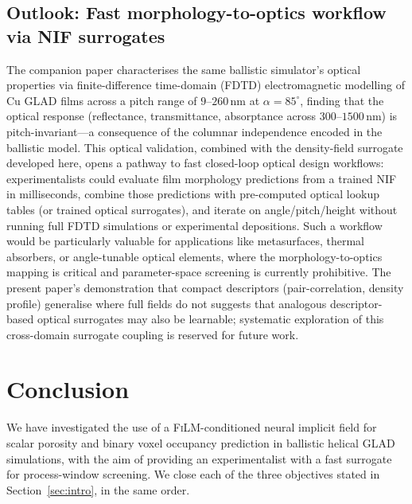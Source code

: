 \documentclass[aip,amsmath,amssymb,reprint]{revtex4-1}
\renewcommand{\ang}{\ensuremath{\alpha}} %
\newcommand{\film}{\textsc{FiLM}}
\begin{document}
\subsection{Outlook: Fast morphology-to-optics workflow via NIF surrogates}
\label{ssec:disc_optical_design}

The companion paper \citep{companionP1} characterises the same ballistic simulator's optical properties via finite-difference time-domain (FDTD) electromagnetic modelling of Cu GLAD films across a pitch range of $9$--$260\,\mathrm{nm}$ at $\ang=85^{\circ}$, finding that the optical response (reflectance, transmittance, absorptance across $300$--$1500\,\mathrm{nm}$) is pitch-invariant—a consequence of the columnar independence encoded in the ballistic model.
This optical validation, combined with the density-field surrogate developed here, opens a pathway to fast closed-loop optical design workflows: experimentalists could evaluate film morphology predictions from a trained NIF in milliseconds, combine those predictions with pre-computed optical lookup tables (or trained optical surrogates), and iterate on angle/pitch/height without running full FDTD simulations or experimental depositions.
Such a workflow would be particularly valuable for applications like metasurfaces, thermal absorbers, or angle-tunable optical elements, where the morphology-to-optics mapping is critical and parameter-space screening is currently prohibitive.
The present paper's demonstration that compact descriptors (pair-correlation, density profile) generalise where full fields do not suggests that analogous descriptor-based optical surrogates may also be learnable; systematic exploration of this cross-domain surrogate coupling is reserved for future work.

\section{Conclusion}
\label{sec:conclusion}

We have investigated the use of a \film{}-conditioned neural implicit
field for scalar porosity and binary voxel occupancy prediction in
ballistic helical GLAD simulations, with the aim of providing an
experimentalist with a fast surrogate for process-window screening.
We close each of the three objectives stated in
Section~\ref{sec:intro}, in the same order.
\end{document}
